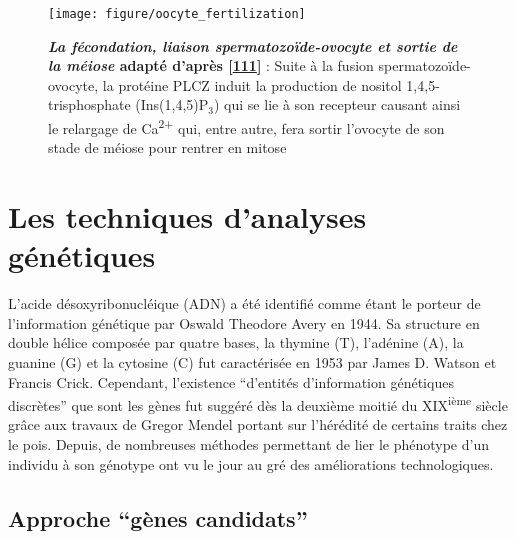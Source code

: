 \documentclass[12pt,a4paper,twoside]{ugathesis}
\theoremstyle{definition}
\theoremstyle{definition}
\theoremstyle{definition}
\theoremstyle{remark}
\begin{document}
\newpage

\begin{figure}

{\centering \texttt{[image: figure/oocyte\_fertilization]} 

}

\caption[La fécondation, liaison spermatozoïde-ovocyte et sortie de la méiose]{\textbf{\emph{La fécondation, liaison
spermatozoïde-ovocyte et sortie de la méiose} adapté d'après
{[}\protect\hyperlink{ref-Clift2013}{111}{]}} : Suite à la fusion
spermatozoïde-ovocyte, la protéine PLCZ induit la production de nositol
1,4,5-trisphosphate (Ins(1,4,5)P\(_3\)) qui se lie à son recepteur
causant ainsi le relargage de Ca\textsuperscript{2+} qui, entre autre,
fera sortir l'ovocyte de son stade de méiose pour rentrer en mitose}\label{fig:oocytefertilisation}
\end{figure}









\newpage

\section{Les techniques d'analyses
génétiques}\label{les-techniques-danalyses-genetiques}

L'acide désoxyribonucléique (ADN) a été identifié comme étant le porteur
de l'information génétique par Oswald Theodore Avery en 1944. Sa
structure en double hélice composée par quatre bases, la thymine (T),
l'adénine (A), la guanine (G) et la cytosine (C) fut caractérisée en
1953 par James D. Watson et Francis Crick. Cependant, l'existence
``d'entités d'information génétiques discrètes'' que sont les gènes fut
suggéré dès la deuxième moitié du XIX\textsuperscript{ième} siècle grâce
aux travaux de Gregor Mendel portant sur l'hérédité de certains traits
chez le pois. Depuis, de nombreuses méthodes permettant de lier le
phénotype d'un individu à son génotype ont vu le jour au gré des
améliorations technologiques.

\subsection{\texorpdfstring{Approche ``gènes
candidats''}{Approche gènes candidats}}\label{approche-genes-candidats}
\end{document}

